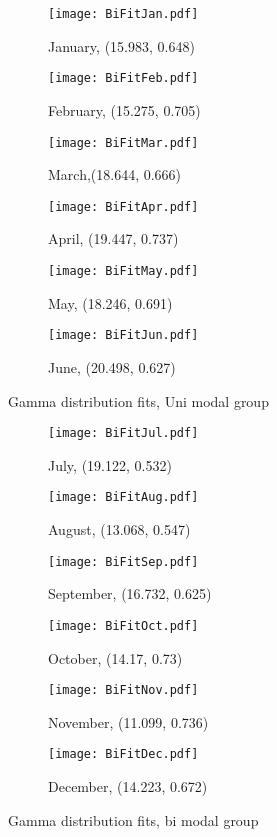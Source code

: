 \documentclass{article}
\begin{document}
	\begin{figure}[H]
		\ContinuedFloat*
		\centering
		\begin{subfigure}{0.5\textwidth}
			\centering
			\texttt{[image: BiFitJan.pdf]}
			\caption{January, (15.983, 0.648)}
		\end{subfigure}%
		\begin{subfigure}{0.5\textwidth}
			\centering
			\texttt{[image: BiFitFeb.pdf]}
			\caption{February, (15.275, 0.705)}
		\end{subfigure}
		\begin{subfigure}{0.5\textwidth}
			\centering
			\texttt{[image: BiFitMar.pdf]}
			\caption{March,(18.644, 0.666)}
		\end{subfigure}%
		\begin{subfigure}{0.5\textwidth}
			\centering
			\texttt{[image: BiFitApr.pdf]}
			\caption{April, (19.447, 0.737)}
		\end{subfigure}
		\begin{subfigure}{0.5\textwidth}
			\centering
			\texttt{[image: BiFitMay.pdf]}
			\caption{May, (18.246, 0.691)}
		\end{subfigure}%
		\begin{subfigure}{0.5\textwidth}
			\centering
			\texttt{[image: BiFitJun.pdf]}
			\caption{June, (20.498, 0.627)}
		\end{subfigure}
		\caption{Gamma distribution fits, Uni modal group}
		\label{GammaFitBi}
	\end{figure}
	\begin{figure}[H]
		\ContinuedFloat
		\centering
			\begin{subfigure}{0.5\textwidth}
			\centering
			\texttt{[image: BiFitJul.pdf]}
			\caption{July, (19.122, 0.532)}
		\end{subfigure}%
		\begin{subfigure}{0.5\textwidth}
			\centering
			\texttt{[image: BiFitAug.pdf]}
			\caption{August, (13.068, 0.547)}
		\end{subfigure}
		\begin{subfigure}{0.5\textwidth}
			\centering
			\texttt{[image: BiFitSep.pdf]}
			\caption{September, (16.732, 0.625)}
		\end{subfigure}%
		\begin{subfigure}{0.5\textwidth}
			\centering
			\texttt{[image: BiFitOct.pdf]}
			\caption{October, (14.17, 0.73)}
		\end{subfigure}
		\begin{subfigure}{0.5\textwidth}
			\texttt{[image: BiFitNov.pdf]}
			\caption{November, (11.099, 0.736)}
		\end{subfigure}%
		\begin{subfigure}{0.5\textwidth}
			\texttt{[image: BiFitDec.pdf]}
			\caption{December, (14.223, 0.672)}
		\end{subfigure}
		\caption{Gamma distribution fits, bi modal group}
	\end{figure}
	
\end{document}
